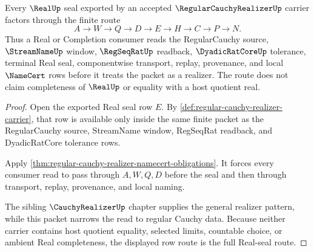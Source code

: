 \begin{theorem}
\label{thm:regular-cauchy-realizer-real-seal-route}
Every $\RealUp$ seal exported by an accepted $\RegularCauchyRealizerUp$ carrier factors through the finite route
$$
A \to W \to Q \to D \to E \to H \to C \to P \to N .
$$
Thus a Real or Completion consumer reads the RegularCauchy source, $\StreamNameUp$ window, $\RegSeqRatUp$ readback, $\DyadicRatCoreUp$ tolerance, terminal Real seal, componentwise transport, replay, provenance, and local $\NameCert$ rows before it treats the packet as a realizer. The route does not claim completeness of $\RealUp$ or equality with a host quotient real.
\end{theorem}
\begin{proof}
Open the exported Real seal row $E$. By \autoref{def:regular-cauchy-realizer-carrier}, that row is available only inside the same finite packet as the RegularCauchy source, StreamName window, RegSeqRat readback, and DyadicRatCore tolerance rows.

Apply \autoref{thm:regular-cauchy-realizer-namecert-obligations}. It forces every consumer read to pass through $A,W,Q,D$ before the seal and then through transport, replay, provenance, and local naming.

The sibling $\CauchyRealizerUp$ chapter supplies the general realizer pattern, while this packet narrows the read to regular Cauchy data. Because neither carrier contains host quotient equality, selected limits, countable choice, or ambient Real completeness, the displayed row route is the full Real-seal route.
\end{proof}




